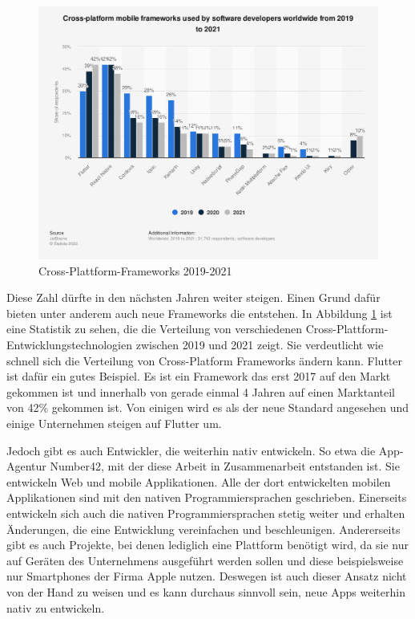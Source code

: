 \begin{figure}[ht]
  \centering
  \includegraphics[width=15cm,keepaspectratio]{images/cross-platform-mobile-frameworks.png} 
  \caption[Statistik Cross-Plattform-Frameworks]{Cross-Plattform-Frameworks 2019-2021 \cite{statist_CP_Framework}}
  \label{fig:statista_cross_plattform}
\end{figure}

Diese Zahl dürfte in den nächsten Jahren weiter steigen. Einen Grund dafür bieten unter anderem auch neue Frameworks die entstehen. In Abbildung \ref{fig:statista_cross_plattform} ist eine Statistik zu sehen, die die Verteilung von verschiedenen Cross-Plattform-Entwicklungstechnologien zwischen 2019 und 2021 zeigt. Sie verdeutlicht wie schnell sich die Verteilung von Cross-Platform Frameworks ändern kann. Flutter ist dafür ein gutes Beispiel. Es ist ein Framework das erst 2017 auf den Markt gekommen ist und innerhalb von gerade einmal 4 Jahren auf einen Marktanteil von 42\% gekommen ist. Von einigen wird es als der neue Standard angesehen und einige Unternehmen steigen auf Flutter um. 

Jedoch gibt es auch Entwickler, die weiterhin nativ entwickeln. So etwa die App-Agentur Number42, mit der diese Arbeit in Zusammenarbeit entstanden ist. Sie entwickeln Web und mobile Applikationen. Alle der dort entwickelten mobilen Applikationen sind mit den nativen Programmiersprachen geschrieben. Einerseits entwickeln sich auch die nativen Programmiersprachen stetig weiter und erhalten Änderungen, die eine Entwicklung vereinfachen und beschleunigen. Andererseits gibt es auch Projekte, bei denen lediglich eine Plattform benötigt wird, da sie nur auf Geräten des Unternehmens ausgeführt werden sollen und diese beispielsweise nur Smartphones der Firma Apple nutzen. Deswegen ist auch dieser Ansatz nicht von der Hand zu weisen und es kann durchaus sinnvoll sein, neue Apps weiterhin nativ zu entwickeln.

